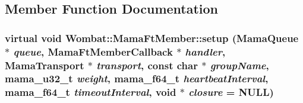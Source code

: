 \subsection{Member Function Documentation}
\hypertarget{classWombat_1_1MamaFtMember_a5a57ce6bb1f5d7ff85eac37acbf4b405}{
\subsubsection[{setup}]{\setlength{\rightskip}{0pt plus 5cm}virtual void Wombat::MamaFtMember::setup ({\bf MamaQueue} $\ast$ {\em queue}, \/  {\bf MamaFtMemberCallback} $\ast$ {\em handler}, \/  {\bf MamaTransport} $\ast$ {\em transport}, \/  const char $\ast$ {\em groupName}, \/  mama\_\-u32\_\-t {\em weight}, \/  mama\_\-f64\_\-t {\em heartbeatInterval}, \/  mama\_\-f64\_\-t {\em timeoutInterval}, \/  void $\ast$ {\em closure} = {\ttfamily NULL})}}
\label{classWombat_1_1MamaFtMember_a5a57ce6bb1f5d7ff85eac37acbf4b405}



